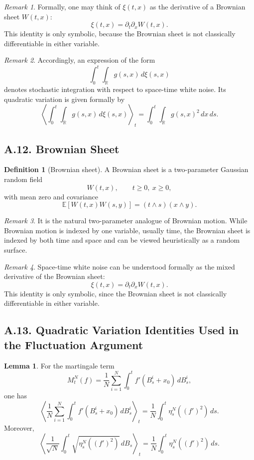 \documentclass[11pt]{article}
\theoremstyle{definition}
\newtheorem{definition}{Definition}
\newtheorem{lemma}{Lemma}
\theoremstyle{remark}
\newtheorem{remark}{Remark}
\begin{document}
\begin{remark}
Formally, one may think of $\xi(t,x)$ as the derivative of a Brownian sheet $W(t,x)$:
\[
\xi(t,x)=\partial_t\partial_x W(t,x).
\]
This identity is only symbolic, because the Brownian sheet is not classically differentiable in either variable.
\end{remark}

\begin{remark}
Accordingly, an expression of the form
\[
\int_0^t \int_{\mathbb R} g(s,x)\,d\xi(s,x)
\]
denotes stochastic integration with respect to space-time white noise. Its quadratic variation is given formally by
\[
\left\langle \int_0^t \int_{\mathbb R} g(s,x)\,d\xi(s,x)\right\rangle_t
=
\int_0^t \int_{\mathbb R} g(s,x)^2\,dx\,ds.
\]
\end{remark}

\subsection*{A.12. Brownian Sheet}
\begin{definition}[Brownian sheet]
A Brownian sheet is a two-parameter Gaussian random field
\[
W(t,x), \qquad t\ge 0,\ x\ge 0,
\]
with mean zero and covariance
\[
\mathbb E[W(t,x)W(s,y)]=(t\wedge s)(x\wedge y).
\]
\end{definition}

\begin{remark}
It is the natural two-parameter analogue of Brownian motion. While Brownian motion is indexed by one variable, usually time, the Brownian sheet is indexed by both time and space and can be viewed heuristically as a random surface.
\end{remark}

\begin{remark}
Space-time white noise can be understood formally as the mixed derivative of the Brownian sheet:
\[
\xi(t,x)=\partial_t\partial_x W(t,x).
\]
This identity is only symbolic, since the Brownian sheet is not classically differentiable in either variable.
\end{remark}

\subsection*{A.13. Quadratic Variation Identities Used in the Fluctuation Argument}
\begin{lemma}
For the martingale term
\[
M_t^N(f)=\frac{1}{N}\sum_{i=1}^N \int_0^t f'(B_s^i+x_0)\,dB_s^i,
\]
one has
\[
\left\langle
\frac{1}{N}\sum_{i=1}^N \int_0^t f'(B_s^i+x_0)\,dB_s^i
\right\rangle_t
=
\frac{1}{N}\int_0^t \eta_s^N((f')^2)\,ds.
\]
Moreover,
\[
\left\langle
\frac{1}{\sqrt{N}}\int_0^t \sqrt{\eta_s^N((f')^2)}\,dB_s
\right\rangle_t
=
\frac{1}{N}\int_0^t \eta_s^N((f')^2)\,ds.
\]
\end{lemma}
\end{document}
